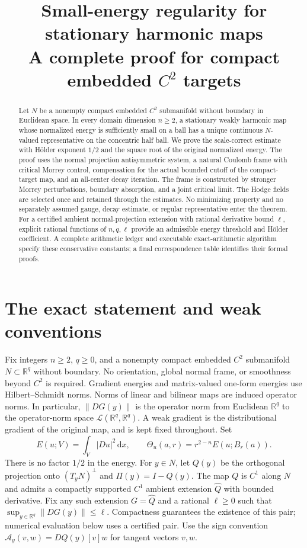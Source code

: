 \documentclass[11pt,a4paper]{article}
\title{Small-energy regularity for stationary harmonic maps\\
\large A complete proof for compact embedded $C^2$ targets}
\author{}
\date{}
\numberwithin{equation}{section}
\theoremstyle{definition}
\theoremstyle{remark}
\newcommand{\R}{\mathbb R}
\newcommand{\dd}{\,\mathrm d}
\newcommand{\dx}{\dd x}
\newcommand{\Th}{\Theta}
\newcommand{\norm}[1]{\left\lVert#1\right\rVert}
\begin{document}
\maketitle
\begin{abstract}
Let $N$ be a nonempty compact embedded $C^2$ submanifold without boundary
in Euclidean space. In every domain dimension $n\geq2$, a stationary weakly
harmonic map whose normalized energy is sufficiently small on a ball has a
unique continuous $N$-valued representative on the concentric half ball.
We prove the scale-correct estimate with H\"older exponent $1/2$ and the
square root of the original normalized energy. The proof uses the normal
projection antisymmetric system, a natural Coulomb frame with critical
Morrey control, compensation for the actual bounded cutoff of the
compact-target map, and an all-center decay iteration. The frame is
constructed by stronger Morrey perturbations, boundary absorption, and a
joint critical limit. The Hodge fields are selected once and retained
through the estimates. No minimizing property and no separately assumed
gauge, decay estimate, or regular representative enter the theorem.
For a certified ambient normal-projection extension with rational derivative
bound $\ell$, explicit rational functions of $n,q,\ell$ provide an
admissible energy threshold and H\"older coefficient. A complete arithmetic
ledger and executable exact-arithmetic algorithm specify these conservative
constants; a final correspondence table identifies their formal proofs.
\end{abstract}
\tableofcontents

\section{The exact statement and weak conventions}\label{sec:statement}
Fix integers $n\geq2$, $q\geq0$, and a nonempty compact embedded $C^2$
submanifold $N\subset\R^q$ without boundary. No orientation, global normal
frame, or smoothness beyond $C^2$ is required. Gradient energies and matrix-valued one-form energies use Hilbert--Schmidt
norms. Norms of linear and bilinear maps are induced operator norms.
In particular, $\norm{DG(y)}$ is the operator norm from Euclidean
$\R^q$ to the operator-norm space $\mathcal L(\R^q,\R^q)$. A weak gradient is the distributional
gradient of the original map, and is kept fixed throughout. Set
\[
 E(u;V)=\int_V|Du|^2\dx,\qquad
 \Th_u(a,r)=r^{2-n}E(u;B_r(a)).
\]
There is no factor $1/2$ in the energy.
For $y\in N$, let $Q(y)$ be the orthogonal projection onto $(T_yN)^\perp$
and $\Pi(y)=I-Q(y)$. The map $Q$ is $C^1$ along $N$ and admits a compactly
supported $C^1$ ambient extension $\widehat Q$ with bounded derivative.
Fix any such extension $G=\widehat Q$ and a rational $\ell\geq0$ such that
$\sup_{y\in\R^q}\norm{DG(y)}\leq\ell$. Compactness guarantees the
existence of this pair; numerical evaluation below uses a certified pair.
Use the sign convention
$\mathcal A_y(v,w)=DQ(y)[v]w$ for tangent vectors $v,w$.
\end{document}
